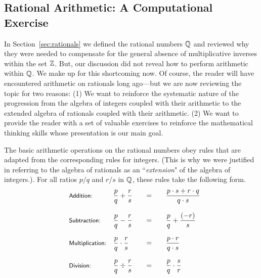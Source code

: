 \subsection{Rational Arithmetic: A Computational Exercise}
\label{sec:Rational-arithmetic}

In Section~\ref{sec:rationals} we defined the rational numbers $\mathbb{Q}$ and reviewed why they were needed to compensate for the general absence of multiplicative inverses within the set $\mathbb{Z}$.  But, our discussion did not reveal how to perform arithmetic within $\mathbb{Q}$.  We make up for this shortcoming now.  Of course, the reader will have encountered arithmetic on rationals long ago---but we are now reviewing the topic for two reasons:  (1) We want to reinforce the systematic nature of the progression from the algebra of integers coupled with their arithmetic to the extended algebra of rationals coupled with their arithmetic.  (2) We want to provide the reader with a set of valuable exercises to reinforce the mathematical thinking skills whose presentation is our main goal.

\medskip

The basic arithmetic operations on the rational numbers obey rules that are adapted from the corresponding rules for integers.  (This is why we were justified in referring to the algebra of rationals as an ``{\em extension}" of the algebra of integers.). For all ratios $p/q$ and $r/s$ in $\mathbb{Q}$, these rules take the following form.
\[
\begin{array}{llcccl}
\mbox{\small\sf Addition:} & 
{\displaystyle
{p \over q} + {r \over s} }
  & & = & &
{\displaystyle
 \frac{p \cdot s + r \cdot q}{q \cdot s} }  \\
 & & & & & \\
\mbox{\small\sf Subtraction:} &
{\displaystyle
{p \over q} - {r \over s} }
  & & = & &
{\displaystyle
{p \over q} + {(-r) \over s} } \\
 & & & & & \\
\mbox{\small\sf Multiplication:} &
{\displaystyle
{p \over q} \cdot {r \over s} }
  & & = & &
{\displaystyle
\frac{p \cdot r}{q \cdot s} } \\
  & & & & & \\
\mbox{\small\sf Division:} &
{\displaystyle
{p \over q} \div {r \over s} }
  & & = & &
{\displaystyle
{p \over q} \cdot {s \over r} }
\end{array}
\]

\smallskip

